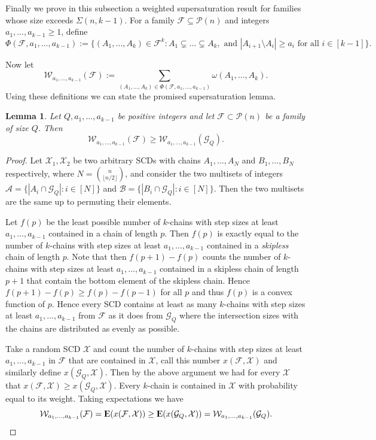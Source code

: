 \documentclass[12pt]{article}
\newtheorem{lemma}[theorem]{Lemma}
\numberwithin{equation}{section}
\def\A{\mathcal{A}}
\def\B{\mathcal{B}}
\def\F{\mathcal{F}}
\def\G{\mathcal{G}}
\def\P{\mathcal{P}}
\def\W{\mathcal{W}}
\def\X{\mathcal{X}}
\def\w{\omega}
\begin{document}
Finally we prove in this subsection a weighted supersaturation result for families whose size exceeds $\Sigma(n,k-1)$.
For a family $\F\subseteq \P(n)$  and integers $a_1,\ldots,a_{k-1}\geq 1$, define 
$$\Phi(\F,a_1,\ldots,a_{k-1}):=\{(A_1,\ldots,A_k)\in\F^k: A_1\subsetneq \ldots \subsetneq A_k, \text{ and } |A_{i+1}\setminus A_i|\geq a_i \text{ for all } i\in [k-1]\}.$$

 Now let
$$\W_{a_1,\ldots,a_{k-1}}(\F):=\sum_{(A_1,\ldots,A_k)\in\Phi(\F,a_1,\ldots,a_{k-1})}\w(A_1,\ldots,A_k).$$
Using these definitions we can state the promised supersaturation lemma.
\begin{lemma}\label{supersat}
Let $Q,a_1,\ldots, a_{k-1}$ be positive integers and let $\F\subset \P(n)$ be a family of size $Q$. Then
$$\W_{a_1,\ldots,a_{k-1}}(\F)\geq \W_{a_1,\ldots,a_{k-1}}(\G_Q).$$
\end{lemma}
\begin{proof}
Let $\X_1,\X_2$ be two arbitrary SCDs with chains $A_1,\ldots,A_{N}$ and $B_1,\ldots,B_N$ respectively, where $N=\binom{n}{\lfloor n/2\rfloor}$, and consider the two multisets of integers $\A=\{|A_i\cap \G_Q|:i\in[N]\}$ and $\B=\{|B_i\cap \G_Q|:i\in[N]\}$. Then the two multisets are the same up to permuting their elements.

Let $f(p)$ be the least possible number of $k$-chains with step sizes at least $a_1,\ldots,a_{k-1}$ contained in a chain of length $p$. Then $f(p)$ is exactly equal to the number of $k$-chains with step sizes at least $a_1,\ldots,a_{k-1}$ contained in a \emph{skipless} chain of length $p$. Note that then $f(p+1)-f(p)$ counts the number of $k$-chains with step sizes at least $a_1,\ldots,a_{k-1}$ contained in a skipless chain of length $p+1$ that contain the bottom element of the skipless chain. Hence $f(p+1)-f(p)\geq f(p)-f(p-1)$ for all $p$ and thus $f(p)$ is a convex function of $p$.  Hence every SCD contains at least as many $k$-chains with step sizes at least $a_1,\ldots,a_{k-1}$ from $\F$ as it does from $\G_Q$ where the intersection sizes with the chains are distributed as evenly as possible.

Take a random SCD $\X$ and count the number of $k$-chains with step sizes at least $a_1,\ldots,a_{k-1}$ in $\F$ that are contained in $\X$, call this number $x(\F,\X)$ and similarly define $x(\G_Q,\X)$. Then by the above argument we had for every $\X$ that $x(\F,\X)\geq x(\G_Q,\X)$. Every $k$-chain is contained in $\X$ with probability equal to its weight. Taking expectations we have
$$\W_{a_1,\ldots,a_{k-1}}(\F)={\rm I\kern-.3em E}(x(\F,\X))\geq {\rm I\kern-.3em E}(x(\G_Q,\X))=\W_{a_1,\ldots,a_{k-1}}(\G_Q).$$
\end{proof}
\end{document}
